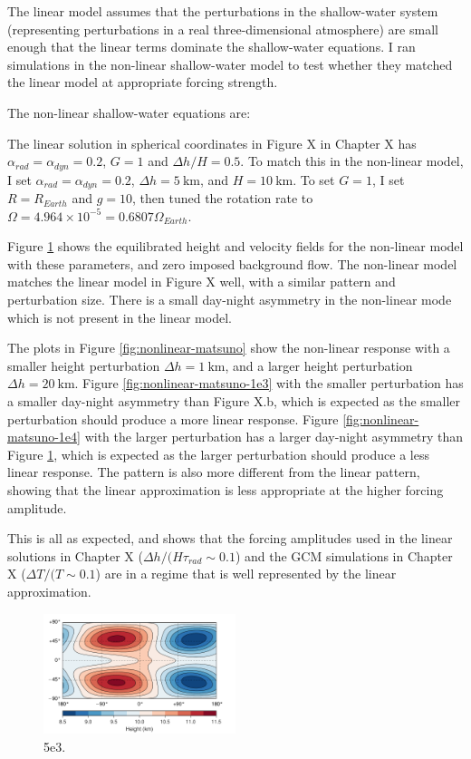 The linear model assumes that the perturbations in the shallow-water system (representing perturbations in a real three-dimensional atmosphere) are small enough that the linear terms dominate the shallow-water equations. I ran simulations in the non-linear shallow-water model to test whether they matched the linear model at appropriate forcing strength.

The non-linear shallow-water equations are:

The linear solution in spherical coordinates in Figure X in Chapter X has $\alpha_{rad} = \alpha_{dyn} = 0.2$, $G = 1$ and $\Delta h / H = 0.5$. To match this in the non-linear model, I set $\alpha_{rad} = \alpha_{dyn} = 0.2$, $\Delta h = 5\ \textrm{km}$, and $ H = 10\ \textrm{km}$. To set $G=1$, I set $R=R_{Earth}$ and $g=10$, then tuned the rotation rate to $\Omega = 4.964\times10^{-5}=0.6807\Omega_{Earth}$.

Figure \ref{fig:nonlinear-matsuno-control} shows the equilibrated height and velocity fields for the non-linear model with these parameters, and zero imposed background flow. The non-linear model matches the linear model in Figure X well, with a similar pattern and perturbation size. There is a small day-night asymmetry in the non-linear mode which is not present in the linear model.

The plots in Figure \ref{fig:nonlinear-matsuno} show the non-linear response with a smaller height perturbation $\Delta h = 1\ \textrm{km}$, and a larger height perturbation $\Delta h = 20\ \textrm{km}$. Figure \ref{fig:nonlinear-matsuno-1e3} with the smaller perturbation has a smaller day-night asymmetry than Figure X.b, which is expected as the smaller perturbation should produce a more linear response. Figure \ref{fig:nonlinear-matsuno-1e4} with the larger perturbation has a larger day-night asymmetry than Figure \ref{fig:nonlinear-matsuno-control}, which is expected as the larger perturbation should produce a less linear response. The pattern is also more different from the linear pattern, showing that the linear approximation is less appropriate at the higher forcing amplitude.

This is all as expected, and shows that the forcing amplitudes used in the linear solutions in Chapter X ($\Delta h / (H \tau_{rad} \sim 0.1$) and the GCM simulations in Chapter X ($\Delta T / (T \sim 0.1$) are in a regime that is well represented by the linear approximation.


\begin{figure}
  \centering
  \includegraphics[width=0.5\textwidth]{figures/nonlinear-circulation/nonlin-matsuno-5e3.pdf}
  \caption{5e3.}
  \label{fig:nonlinear-matsuno-control}
\end{figure}


